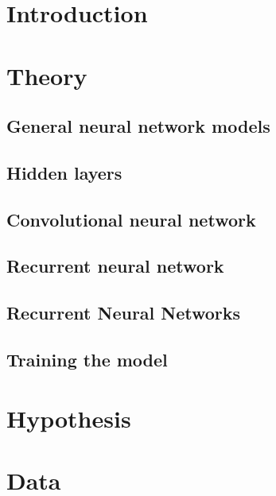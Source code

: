 \documentclass[a4paper]{article}
\begin{document}
\maketitle

\newpage
\tableofcontents
\newpage

\section{Introduction}


\section{Theory}
\subsection{General neural network models}


\subsection{Hidden layers}


\subsection{Convolutional neural network}


\subsection{Recurrent neural network}


\subsection{Recurrent Neural Networks}


\subsection{Training the model}


\section{Hypothesis}

\section{Data}

\end{document}

